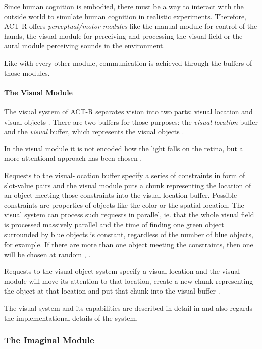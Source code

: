 Since human cognition is embodied, there must be a way to interact with the outside world to simulate human cognition in realistic experiments. Therefore, ACT-R offers \emph{perceptual/motor modules} like the manual module for control of the hands, the visual module for perceiving and processing the visual field or the aural module perceiving sounds in the environment.

Like with every other module, communication is achieved through the buffers of those modules. 

\paragraph{The Visual Module} The visual system of ACT-R separates vision into two parts: visual location and visual objects \cite[p. 1039]{anderson_integrated_2004}. There are two buffers for those purposes: the \emph{visual-location} buffer and the \emph{visual} buffer, which represents the visual objects \cite[unit 2]{actr_tutorial}.

In the visual module it is not encoded how the light falls on the retina, but a more attentional approach has been chosen \cite[p. 1039]{anderson_integrated_2004}. 

Requests to the visual-location buffer specify a series of constraints in form of slot-value pairs and the visual module puts a chunk representing the location of an object meeting those constraints into the visual-location buffer. Possible constraints are properties of objects like the color or the spatial location. The visual system can process such requests in parallel, ie. that the whole visual field is processed massively parallel and the time of finding one green object surrounded by blue objects is constant, regardless of the number of blue objects, for example. If there are more than one object meeting the constraints, then one will be chosen at random \cite[1039]{anderson_integrated_2004}, \cite[68]{anderson_how_2007}.

Requests to the visual-object system specify a visual location and the visual module will move its attention to that location, create a new chunk representing the object at that location and put that chunk into the visual buffer \cite[unit 2, chapter 2.5.3]{actr_tutorial}.

The visual system and its capabilities are described in detail in \cite[unit 2]{actr_tutorial} and also regards the implementational details of the system.

\subsubsection{The Imaginal Module}

